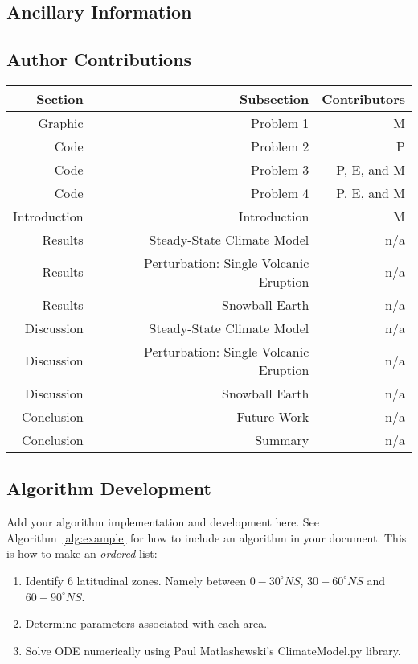 \documentclass{article}
\begin{document}
\begin{appendices}

\section{Ancillary Information}
\subsection{Author Contributions}
\begin{table}[H]
    \centering
    \begin{tabular}{rrr}
    Section & Subsection & Contributors \\
    \hline
    Graphic & Problem 1 & M  \\
    Code & Problem 2 & P \\
    Code & Problem 3 & P, E, and M \\
    Code & Problem 4 & P, E, and M \\
    Introduction & Introduction & M \\
    Results & Steady-State Climate Model & n/a \\
    Results & Perturbation: Single Volcanic Eruption & n/a \\
    Results & Snowball Earth & n/a\\
    Discussion & Steady-State Climate Model & n/a \\
    Discussion & Perturbation: Single Volcanic Eruption & n/a \\
    Discussion & Snowball Earth & n/a\\
    Conclusion & Future Work & n/a \\
    Conclusion & Summary & n/a \\
    \end{tabular}
    \label{tab:contributions}
\end{table}
\FloatBarrier

\subsection{Algorithm Development}
Add your algorithm implementation and development here. See Algorithm~\ref{alg:example} for how to include an algorithm in your document. This is how to make an \textit{ordered} list:
\begin{enumerate}
    \item Identify 6 latitudinal zones. Namely between $0-30^{\circ}NS$, $30-60^{\circ}NS$ and $60-90^{\circ}NS$.
    \item Determine parameters associated with each area.
    \item Solve ODE numerically using Paul Matlashewski's ClimateModel.py library.  
\end{enumerate}


\end{appendices}
\end{document}
